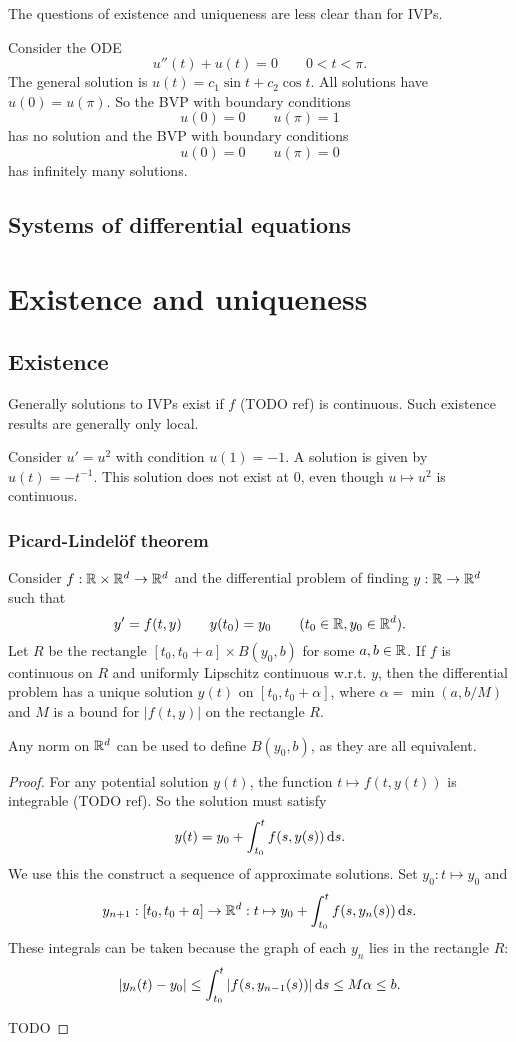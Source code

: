 The questions of existence and uniqueness are less clear than for IVPs.
\begin{example}
Consider the ODE
\[ u''(t) + u(t) = 0 \qquad 0<t<\pi. \]
The general solution is $u(t) = c_1\sin t + c_2 \cos t$. All solutions have $u(0) = u(\pi)$.
So the BVP with boundary conditions
\[ u(0) = 0 \qquad u(\pi) = 1 \]
has no solution and the BVP with boundary conditions
\[ u(0) = 0 \qquad u(\pi) = 0 \]
has infinitely many solutions.
\end{example}


\subsection{Systems of differential equations}


\section{Existence and uniqueness}
\subsection{Existence}
Generally solutions to IVPs exist if $f$ (TODO ref) is continuous. Such existence results are generally only local.

\begin{example}
Consider $u' = u^2$ with condition $u(1) = -1$. A solution is given by $u(t) = -t^{-1}$. This solution does not exist at $0$, even though $u\mapsto u^2$ is continuous.
\end{example}

\subsubsection{Picard-Lindelöf theorem}
\begin{theorem}
Consider $f: \mathbb{R}\times \mathbb{R}^d \to \mathbb{R}^d$ and the differential problem of finding $y:\mathbb{R}\to \mathbb{R}^d$ such that
\[ y' = f(t,y) \qquad y(t_0) = y_0 \qquad (t_0\in \mathbb{R}, y_0\in\mathbb{R}^d). \]
Let $R$ be the rectangle $[t_0,t_0+a]\times B(y_0, b)$ for some $a,b\in \mathbb{R}$.
If $f$ is continuous on $R$  and uniformly Lipschitz continuous w.r.t. $y$, then the differential problem has a unique solution $y(t)$ on $[t_0,t_0+\alpha]$, where $\alpha = \min(a,b/M)$ and $M$ is a bound for $|f(t,y)|$ on the rectangle $R$.
\end{theorem}
Any norm on $\mathbb{R}^d$ can be used to define $B(y_0, b)$, as they are all equivalent.
\begin{proof}
For any potential solution $y(t)$, the function $t\mapsto f(t,y(t))$ is integrable (TODO ref). So the solution must satisfy \[ y(t) = y_0 + \int_{t_0}^tf(s, y(s))\operatorname{d \!}{s}. \]
We use this the construct a sequence of approximate solutions. Set $y_0: t\mapsto y_0$ and
\[ y_{n+1}: [t_0, t_0+a] \to \mathbb{R}^d: t\mapsto y_0 + \int_{t_0}^t f(s,y_n(s))\operatorname{d \!}{s}. \]
These integrals can be taken because the graph of each $y_n$ lies in the rectangle $R$:
\[ |y_n(t) - y_0| \leq \int_{t_0}^t|f(s,y_{n-1}(s))|\operatorname{d \!}{s} \leq M\alpha \leq b. \]

TODO
\end{proof}

